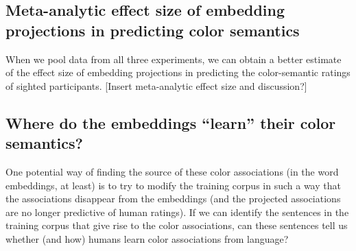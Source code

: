 \documentclass[10pt,letterpaper]{article}
\begin{document}
\subsection{Meta-analytic effect size of embedding projections in predicting color semantics}
When we pool data from all three experiments, we can obtain a better estimate of the effect size of embedding projections in predicting the color-semantic ratings of sighted participants. [Insert meta-analytic effect size and discussion?]

\subsection{Where do the embeddings ``learn'' their color semantics?}
One potential way of finding the source of these color associations (in the word embeddings, at least) is to try to modify the training corpus in such a way that the associations disappear from the embeddings (and the projected associations are no longer predictive of human ratings). If we can identify the sentences in the training corpus that give rise to the color associations, can these sentences tell us whether (and how) humans learn color associations from language?
\end{document}
